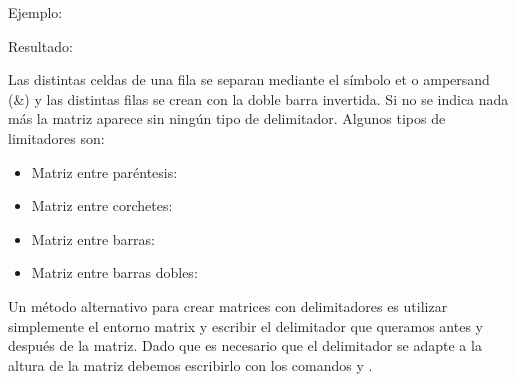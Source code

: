 \documentclass[11pt, a4paper]{article}
\begin{document}
Ejemplo:

        
			
				
				
			

Resultado:


Las distintas celdas de una fila se separan mediante el símbolo et o ampersand (\&) y las distintas filas se crean con la doble barra invertida. Si no se indica nada más la matriz aparece sin ningún tipo de delimitador. Algunos tipos de limitadores son:
\begin{itemize}
\item Matriz entre paréntesis: 

\item Matriz entre corchetes: 

\item Matriz entre barras: 

\item Matriz entre barras dobles: 
\end{itemize}

Un método alternativo para crear matrices con delimitadores es utilizar simplemente el entorno matrix y escribir el delimitador que queramos antes y después de la matriz. Dado que es necesario que el delimitador se adapte a la altura de la matriz debemos escribirlo con los comandos  y .






\end{document}
